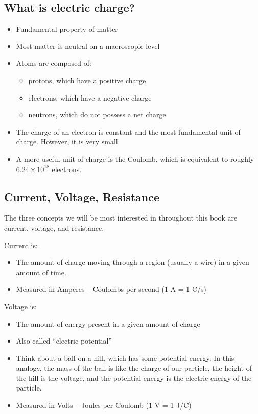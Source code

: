 
\subsection*{What is electric charge?}
\begin{itemize}
\item Fundamental property of matter
\item Most matter is neutral on a macroscopic level
\item Atoms are composed of:
  \begin{itemize}
  \item protons, which have a positive charge
  \item electrons, which have a negative charge
  \item neutrons, which do not possess a net charge
  \end{itemize}
\item The charge of an electron is constant and the most fundamental unit of charge.  However, it is very small
\item A more useful unit of charge is the Coulomb, which is equivalent to roughly $6.24\times 10^{18}$ electrons.
\end{itemize}

\subsection*{Current, Voltage, Resistance}
The three concepts we will be most interested in throughout this book are current, voltage, and resistance.

Current is:
\begin{itemize}
\item The amount of charge moving through a region (usually a wire) in a given amount of time.
\item Measured in Amperes -- Coulombs per second (1 A = 1 C/s)
\end{itemize}

Voltage is:
\begin{itemize}
\item The amount of energy present in a given amount of charge
\item Also called ``electric potential''
\item Think about a ball on a hill, which has some potential energy.  In this analogy, the mass of the ball is like the charge of our particle, the height of the hill is the voltage, and the potential energy is the electric energy of the particle.
\item Measured in Volts -- Joules per Coulomb (1 V = 1 J/C)
\end{itemize}

